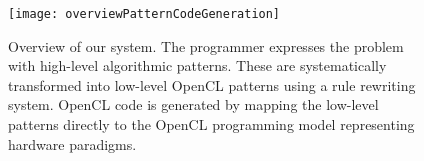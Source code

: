 
\begin{figure}[t]
\centering
\texttt{[image: overviewPatternCodeGeneration]}
\vspace{-19pt}
\caption{
Overview of our system.
The programmer expresses the problem with high-level algorithmic patterns.
These are systematically transformed into low-level OpenCL patterns using a rule rewriting system.
OpenCL code is generated by mapping the low-level patterns directly to the OpenCL programming model representing hardware paradigms.
\vspace{-1em}}
\label{fig:highlevel}
\end{figure}






